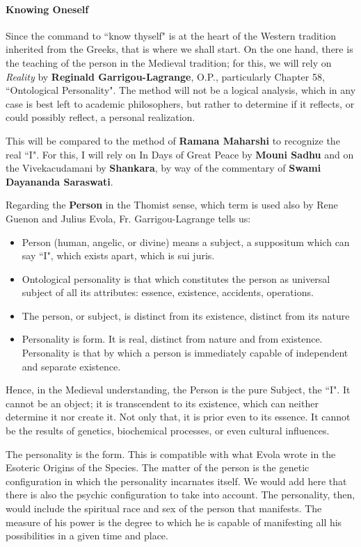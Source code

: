 \paragraph{Knowing Oneself}
Since the command to ``know thyself" is at the heart of the Western tradition inherited from the Greeks, that is where we shall start. On the one hand, there is the teaching of the person in the Medieval tradition; for this, we will rely on \textit{Reality} by \textbf{Reginald Garrigou-Lagrange}, O.P., particularly Chapter 58, ``Ontological Personality". The method will not be a logical analysis, which in any case is best left to academic philosophers, but rather to determine if it reflects, or could possibly reflect, a personal realization.

This will be compared to the method of \textbf{Ramana Maharshi} to recognize the real ``I". For this, I will rely on In Days of Great Peace by \textbf{Mouni Sadhu} and on the Vivekacudamani by \textbf{Shankara}, by way of the commentary of \textbf{Swami Dayananda Saraswati}.

Regarding the \textbf{Person} in the Thomist sense, which term is used also by Rene Guenon and Julius Evola, Fr. Garrigou-Lagrange tells us:

\begin{itemize}
\item Person (human, angelic, or divine) means a subject, a suppositum which can say ``I", which exists apart, which is sui juris. 
\item Ontological personality is that which constitutes the person as universal subject of all its attributes: essence, existence, accidents, operations. 
\item The person, or subject, is distinct from its existence, distinct from its nature 
\item Personality is form. It is real, distinct from nature and from existence. Personality is that by which a person is immediately capable of independent and separate existence. 
\end{itemize}
Hence, in the Medieval understanding, the Person is the pure Subject, the ``I". It cannot be an object; it is transcendent to its existence, which can neither determine it nor create it. Not only that, it is prior even to its essence. It cannot be the results of genetics, biochemical processes, or even cultural influences.

The personality is the form. This is compatible with what Evola wrote in the Esoteric Origins of the Species. The matter of the person is the genetic configuration in which the personality incarnates itself. We would add here that there is also the psychic configuration to take into account. The personality, then, would include the spiritual race and sex of the person that manifests. The measure of his power is the degree to which he is capable of manifesting all his possibilities in a given time and place.

